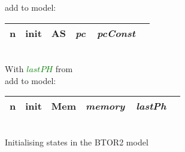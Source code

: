 \begin{algorithm}
    add to model:\\
    \begin{tabular}[h]{>{\ttfamily\color{UniRed}}r >{\ttfamily}l >{\ttfamily\color{UniGrey}}l >{\slshape\color{UniRed}}l >{\slshape} l}
        \hline
        \hline
        \ttfamily
        n & init & AS & pc\ \ pcConst & \\
        \hline
        \hline
    \end{tabular}\\
    \BlankLine
    \BlankLine
    With \textcolor{Green}{$lastPH$} from \\
    add to model:\\
    \begin{tabular}[h]{>{\ttfamily\color{UniRed}}r >{\ttfamily}l >{\ttfamily\color{UniGrey}}l >{\slshape\color{UniRed}}l >{\slshape} l}
        \hline
        \hline
        \ttfamily
        n & init & Mem & memory\ \ \color{Green}lastPh & \\
        \hline
        \hline
    \end{tabular}\\
    \caption[Initialising states]{Initialising states in the BTOR2 model}\label{alg:initstate}
\end{algorithm}